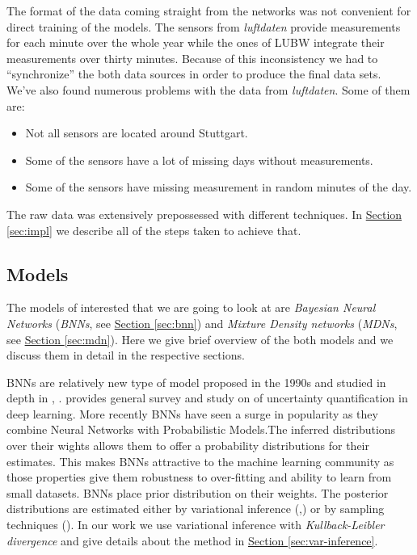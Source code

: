 \documentclass[12pt,a4paper,twoside]{scrartcl}
\numberwithin{equation}{section}
\newcommand{\refsec}[1]{\hyperref[#1]{Section \ref*{#1}}}
\begin{document}
The format of the data coming straight from the networks was not convenient for direct training of the models. The sensors from \emph{luftdaten} provide measurements for each minute over the whole year while the ones of LUBW integrate their measurements over thirty minutes. Because of this inconsistency we had to ``synchronize'' the both data sources in order to produce the final data sets. We've also found numerous problems with the data from \emph{luftdaten}. Some of them are:
\begin{itemize}
\item Not all sensors are located around Stuttgart.
\item Some of the sensors have a lot of missing days without measurements.
\item Some of the sensors have missing measurement in random minutes of the day.
\end{itemize}
The raw data was extensively prepossessed with different techniques. In \refsec{sec:impl} we describe all of the steps taken to achieve that.
\subsection{Models}
\label{sec:models}

The models of interested that we are going to look at are \emph{Bayesian Neural Networks} (\emph{BNNs}, see \refsec{sec:bnn}) and \emph{Mixture Density networks} (\emph{MDNs}, see \refsec{sec:mdn}). Here we give brief overview of the both models and we discuss them in detail in the respective sections.

BNNs are relatively new type of model proposed in the 1990s and studied in depth in \cite{mackay1992}, \cite{neal1996}. \cite{gal2016} provides general survey and study on  of uncertainty quantification in deep learning. More recently BNNs have seen a surge in popularity as they combine Neural Networks with Probabilistic Models.The inferred distributions over their wights allows them to offer a probability distributions for their estimates. This makes BNNs attractive to the machine learning community as those properties give them robustness to over-fitting and ability to learn from small datasets. BNNs place prior distribution on their weights. The posterior distributions are estimated either by variational inference (\cite{blundell2015},\cite{paisley2012}) or by sampling techniques (\cite{vehtari2000}). In our work we use variational inference with \emph{Kullback-Leibler divergence} and give details about the method in \refsec{sec:var-inference}.
\end{document}
